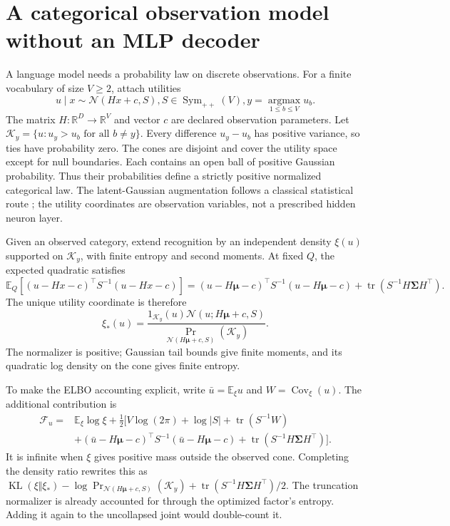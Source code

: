 \documentclass[11pt]{article}
\newcommand{\KL}{\operatorname{KL}}
\newcommand{\Tr}{\operatorname{tr}}
\newcommand{\E}{\mathbb E}
\newcommand{\R}{\mathbb R}
\newcommand{\SPD}{\operatorname{Sym}_{++}}
\newcommand{\Cov}{\operatorname{Cov}}
\newcommand{\m}{\boldsymbol{\mu}}
\newcommand{\Sig}{\boldsymbol{\Sigma}}
\begin{document}
\section{A categorical observation model without an MLP decoder}
\label{sec:readout}

A language model needs a probability law on discrete observations. For a finite vocabulary of size $V\ge2$, attach utilities
\begin{equation}
u\mid x\sim\mathcal N(Hx+c,S), S\in\SPD(V),
 y=\operatorname*{argmax}_{1\le b\le V}u_b.
\label{eq:utility}
\end{equation}
The matrix $H:\R^D\to\R^V$ and vector $c$ are declared observation parameters. Let $\mathcal K_y=\{u:u_y>u_b\text{ for all }b\ne y\}$. Every difference $u_y-u_b$ has positive variance, so ties have probability zero. The cones are disjoint and cover the utility space except for null boundaries. Each contains an open ball of positive Gaussian probability. Thus their probabilities define a strictly positive normalized categorical law. The latent-Gaussian augmentation follows a classical statistical route \citep{AlbertChib1993}; the utility coordinates are observation variables, not a prescribed hidden neuron layer.

Given an observed category, extend recognition by an independent density $\xi(u)$ supported on $\mathcal K_y$, with finite entropy and second moments. At fixed $Q$, the expected quadratic satisfies
\begin{equation}
\E_Q[(u-Hx-c)^\top S^{-1}(u-Hx-c)]
=(u-H\m-c)^\top S^{-1}(u-H\m-c)+\Tr(S^{-1}H\Sig H^\top).
\label{eq:utilityquadratic}
\end{equation}
The unique utility coordinate is therefore
\begin{equation}
\xi_*(u)=\frac{1_{\mathcal K_y}(u)\mathcal N(u;H\m+c,S)}
 {\Pr_{\mathcal N(H\m+c,S)}(\mathcal K_y)}.
\label{eq:truncated}
\end{equation}
The normalizer is positive; Gaussian tail bounds give finite moments, and its quadratic log density on the cone gives finite entropy.

To make the ELBO accounting explicit, write $\bar u=\E_\xi u$ and $W=\Cov_\xi(u)$. The additional contribution is
\begin{equation}
\begin{split}
\mathcal F_u={}&\E_\xi\log\xi+\frac12\bigl[V\log(2\pi)+\log|S|+\Tr(S^{-1}W)\\
&+(\bar u-H\m-c)^\top S^{-1}(\bar u-H\m-c)
 +\Tr(S^{-1}H\Sig H^\top)\bigr].
\end{split}
\label{eq:utilityelbo}
\end{equation}
It is infinite when $\xi$ gives positive mass outside the observed cone. Completing the density ratio rewrites this as $\KL(\xi\Vert\xi_*)-\log\Pr_{\mathcal N(H\m+c,S)}(\mathcal K_y)+\Tr(S^{-1}H\Sig H^\top)/2$. The truncation normalizer is already accounted for through the optimized factor's entropy. Adding it again to the uncollapsed joint would double-count it.
\end{document}
